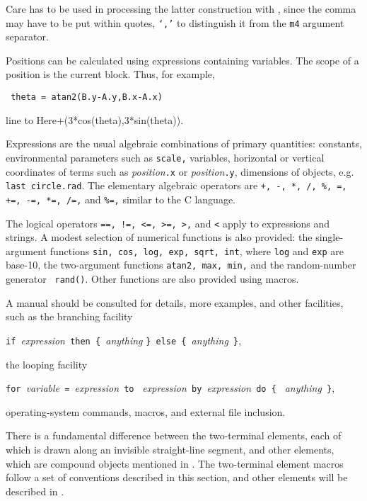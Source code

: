 \noindent%
Care has to be used in processing the latter construction with \Mfour,
since the comma may have to be put within quotes, {\tt `,'}
to distinguish it from the {\tt m4} argument separator.

Positions can be calculated using expressions containing variables.
The scope of a position is the current block.  Thus, for example,

{\tt
  theta = atan2(B.y-A.y,B.x-A.x)

  line to Here+(3*cos(theta),3*sin(theta)).
  }

Expressions are the usual algebraic combinations of primary quantities:
constants, environmental parameters such as {\tt scale,} variables,
horizontal or vertical coordinates of terms such as
{\sl position}{\tt.x} or {\sl position}{\tt.y},
dimensions of \pic objects, e.g. {\tt last circle.rad}.
The elementary algebraic operators are
{\tt +, -, *, /, \%, =, +=, -=, *=, /=,} and {\tt \%=,}
similar to the C language.

The logical operators {\tt ==, !=, <=, >=, >,} and {\tt <} apply to
expressions and strings.  A modest selection of numerical functions is
also provided: the single-argument functions {\tt sin, cos, log, exp,
sqrt, int}, where {\tt log} and {\tt exp} are base-10, the two-argument
functions {\tt atan2, max, min,} and the random-number generator {\tt
rand()}.  Other functions are also provided using macros.

A \pic manual should be consulted for details, more examples, and
other facilities, such as the branching facility

\verb|if |{\sl expression}\verb| then { |{\sl anything} 
  \verb|} else { |{\sl anything}\verb| }|,

\noindent%
the looping facility

\verb|for |{\sl variable}\verb| = |{\sl expression}\verb| to |%
{\sl expression}\verb| by |{\sl expression}\verb| do { |%
{\sl anything}\verb| }|,

\noindent%
operating-system commands, \pic macros, and external file inclusion.

There is a fundamental difference between the two-terminal elements, each
of which is drawn along an invisible straight-line segment,
and other elements, which are compound objects mentioned
in .
The two-terminal element macros follow a
set of conventions described in this section, and other elements will
be described in .

